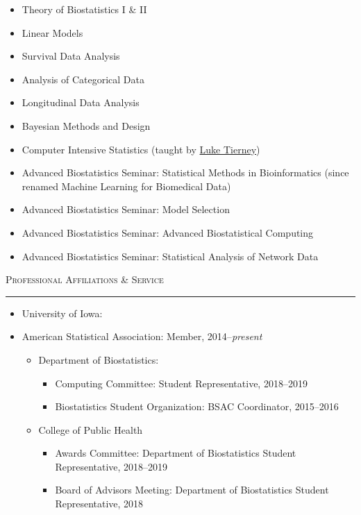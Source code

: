 \documentclass[a4paper]{article}
\begin{document}
\begin{itemize}
  \item Theory of Biostatistics I \& II
  \item Linear Models
  \item Survival Data Analysis
  \item Analysis of Categorical Data
  \item Longitudinal Data Analysis
  \item Bayesian Methods and Design
  \item Computer Intensive Statistics (taught by \href{http://homepage.divms.uiowa.edu/~luke/}{Luke Tierney})
  \item Advanced Biostatistics Seminar: Statistical Methods in Bioinformatics
    (since renamed Machine Learning for Biomedical Data)
  \item Advanced Biostatistics Seminar: Model Selection
  \item Advanced Biostatistics Seminar: Advanced Biostatistical Computing
  \item Advanced Biostatistics Seminar: Statistical Analysis of Network Data
\end{itemize}


\begin{flushleft}
  \Large\textsc{Professional Affiliations \& Service}
  \textcolor{usafagrey}{\rule[0.5\baselineskip]{\textwidth}{0.75pt}}
\end{flushleft}
\vspace{-1.5\baselineskip}

\begin{itemize}
  \item University of Iowa:
  \item American Statistical Association: Member, 2014--\textit{present}
  \begin{itemize}
    \item Department of Biostatistics:
    \begin{itemize}
      \item Computing Committee: Student Representative, 2018--2019
      \item Biostatistics Student Organization: BSAC Coordinator, 2015--2016
    \end{itemize}
    \item College of Public Health
    \begin{itemize}
      \item Awards Committee: Department of Biostatistics Student Representative, 2018--2019
      \item Board of Advisors Meeting: Department of Biostatistics Student Representative, 2018
    \end{itemize}
  \end{itemize}
\end{itemize}
\end{document}
